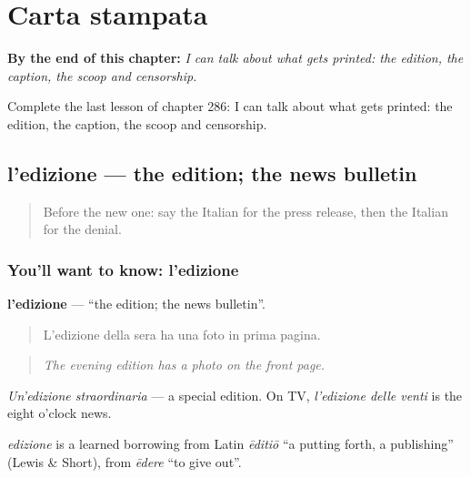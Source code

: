 
\chapter{Carta stampata}
\label{ch:it-carta-stampata}

\begin{chapteropening}
\textbf{By the end of this chapter:} \emph{I can talk about what gets printed: the edition, the caption, the scoop and censorship.}

Complete the last lesson of chapter 286: I can talk about what gets printed: the edition, the caption, the scoop and censorship.
\end{chapteropening}

\section[l'edizione]{l'edizione — the edition; the news bulletin}

\label{lesson:IT-C286-edizione}



\begin{quote}
Before the new one: say the Italian for the press release, then the Italian for the denial.
\end{quote}

\subsection*{You'll want to know: l'edizione}
\textbf{l'edizione} — \textquotedblleft{}the edition; the news bulletin\textquotedblright{}.

\begin{quote}
L'edizione della sera ha una foto in prima pagina.
\end{quote}

\begin{quote}
\emph{The evening edition has a photo on the front page.}
\end{quote}

\emph{Un'edizione straordinaria} — a special edition. On TV, \emph{l'edizione delle venti} is the eight o'clock news.

\begin{cousinweb}
\emph{edizione} is a learned borrowing from Latin \emph{ēditiō} \textquotedblleft{}a putting forth, a publishing\textquotedblright{} (Lewis \& Short), from \emph{ēdere} \textquotedblleft{}to give out\textquotedblright{}.
\end{cousinweb}

